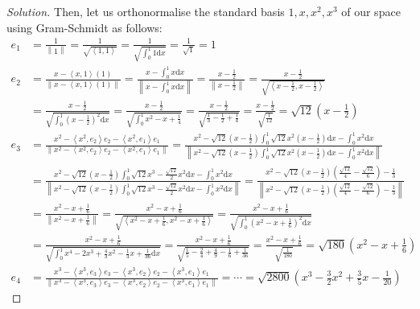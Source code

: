 \documentclass{article}
\newenvironment{solution}{\begin{proof}[Solution]}{\end{proof}}
\newcommand{\norm}[1]{\left\lVert{#1}\right\rVert}
\newcommand{\innerproduct}[2]{\left\langle{#1}, {#2}\right\rangle}
\begin{document}
\begin{solution}
		Then, let us orthonormalise the standard basis $1, x, x^{2}, x^{3}$ of our space using Gram-Schmidt as follows:
		\begin{align*}
			e_{1} &= \frac{1}{\norm{1}} = \frac{1}{\sqrt{\innerproduct{1}{1}}} = \frac{1}{\sqrt{\int_{0}^{1} 1 \mathrm{d}x}} = \frac{1}{\sqrt{1}} = 1 \\
			e_{2} &= \frac{x - \innerproduct{x}{1}(1)}{\norm{x - \innerproduct{x}{1}(1)}} = \frac{x - \int_{0}^{1} x \mathrm dx}{\norm{x - \int_0^{1} x \mathrm dx}} = \frac{x - \frac{1}{2}}{\norm{x - \frac{1}{2}}} = \frac{x - \frac{1}{2}}{\sqrt{\innerproduct{x-\frac{1}{2}}{x - \frac{1}{2}}}} \\
			&= \frac{x - \frac{1}{2}}{\sqrt{\int_{0}^{1} (x-\frac{1}{2})^{2} \mathrm dx}} = \frac{x - \frac{1}{2}}{\sqrt{\int_{0}^{1} x^{2} - x + \frac{1}{4}}} = \frac{x - \frac{1}{2}}{\sqrt{\frac{1}{3} - \frac{1}{2} + \frac{1}{4}}} = \frac{x - \frac{1}{2}}{\sqrt{\frac{1}{12}}} = \sqrt{12}\left(x - \frac{1}{2}\right) \\
			e_{3} &= \frac{x^{2} - \innerproduct{x^{2}}{e_{2}}e_{2} - \innerproduct{x^{2}}{e_{1}}e_{1} }{\norm{x^{2} - \innerproduct{x^{2}}{e_{2}}e_{2} - \innerproduct{x^{2}}{e_{1}}e_{1}}} = \frac{x^{2} - \sqrt{12}\left( x - \frac{1}{2} \right)\int_{0}^{1} \sqrt{12}x^{2}\left( x - \frac{1}{2} \right) \mathrm dx- \int_{0}^{1} x^{2}\mathrm dx}{\norm{x^{2} - \sqrt{12}\left( x - \frac{1}{2} \right)\int_{0}^{1} \sqrt{12}x^{2}\left( x - \frac{1}{2} \right)\mathrm dx - \int_{0}^{1} x^{2} \mathrm dx}} \\
			&= \frac{x^{2} - \sqrt{12}(x - \frac 1 2)\int_{0}^{1}\sqrt{12}x^{3} - 	\frac{\sqrt{12}}{2}x^{2} \mathrm dx - \int_{0}^{1}x^{2} \mathrm dx}{\norm{x^{2} - \sqrt{12}(x - \frac 1 2)\int_{0}^{1}\sqrt{12}x^{3} - \frac{\sqrt{12}}{2}x^{2} \mathrm dx - \int_{0}^{1}x^{2} \mathrm dx}} = \frac{x^{2} - \sqrt{12}(x-\frac 1 2)(\frac{\sqrt{12}}{4} - \frac{\sqrt{12}}{6}) - \frac{1}{3}}{\norm{x^{2} - \sqrt{12}(x-\frac 1 2)(\frac{\sqrt{12}}{4} - \frac{\sqrt{12}}{6}) - \frac{1}{3}}} \\
			&= \frac{x^{2} - x + \frac{1}{6}}{\norm{x^{2} - x + \frac{1}{6}}} = \frac{x^{2} - x + \frac{1}{6}}{\sqrt{\innerproduct{x^{2} - x + \frac{1}{6}}{x^{2} - x + \frac{1}{6}}}} = \frac{x^{2} - x + \frac{1}{6}}{\sqrt{\int_{0}^{1} (x^{2} - x + \frac{1}{6})^{2} \mathrm dx}} \\
			& = \frac{x^{2} - x + \frac{1}{6}}{\sqrt{\int_{0}^{1} x^{4} - 2x^{3} + \frac{4}{3}x^{2} - \frac{1}{3}x + \frac{1}{36} \mathrm dx}} = \frac{x^{2} - x + \frac{1}{6}}{\sqrt{\frac{1}{5} - \frac{2}{4} + \frac{4}{9} - \frac{1}{6} + \frac{1}{36}}} = \frac{x^{2} - x + \frac{1}{6}}{\sqrt{\frac{1}{180}}} = \sqrt{180}\left( x^{2} - x + \frac{1}{6} \right) \\
			e_{4} &= \frac{x^{3} - \innerproduct{x^{3}}{e_{3}}e_{3} - \innerproduct{x^{3}}{e_{2}}e_{2} - \innerproduct{x^{3}}{e_{1}}e_{1}}{\norm{x^{3} - \innerproduct{x^{3}}{e_{3}}e_{3} - \innerproduct{x^{3}}{e_{2}}e_{2} - \innerproduct{x^{3}}{e_{1}}e_{1}}} = \cdots = \sqrt{2800}\left(x^{3} - \frac{3}{2}x^{2} + \frac{3}{5}x - \frac{1}{20}\right)
		\end{align*}
		

\end{solution}
\end{document}
